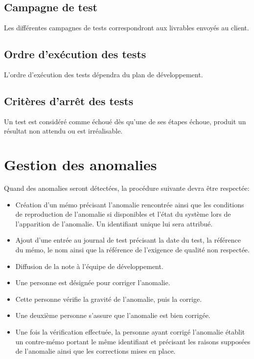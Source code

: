 \documentclass{../res/univ-projet}
\begin{document}
\subsection{Campagne de test}

Les différentes campagnes de tests correspondront aux livrables envoyés au client.

\subsection{Ordre d'exécution des tests}

L'ordre d'exécution des tests dépendra du plan de développement.

\subsection{Critères d'arrêt des tests}

Un test est considéré comme échoué dès qu'une de ses étapes échoue, produit un résultat non attendu ou est irréalisable.


\section{Gestion des anomalies}

Quand des anomalies seront détectées, la procédure suivante devra être respectée:
  \begin{itemize}
   \item Création d'un mémo précisant l'anomalie rencontrée ainsi que les conditions de reproduction de l'anomalie si disponibles et l'état du système lors de l'apparition de l'anomalie.  
   Un identifiant unique lui sera attribué.
   \item Ajout d'une entrée au journal de test précisant la date du test, la référence du mémo, le nom ainsi que la référence de l'exigence de 
   qualité non respectée.
   \item Diffusion de la note à l'équipe de développement.
   \item Une personne est désignée pour corriger l'anomalie.
   \item Cette personne vérifie la gravité de l'anomalie, puis la corrige.
   \item Une deuxième personne s'assure que l'anomalie est bien corrigée.
   \item Une fois la vérification effectuée, la personne ayant corrigé l'anomalie établit un contre-mémo portant le même identifiant et précisant les raisons supposées 
   de l'anomalie ainsi que les corrections mises en place.
  \end{itemize}
  
\end{document}
